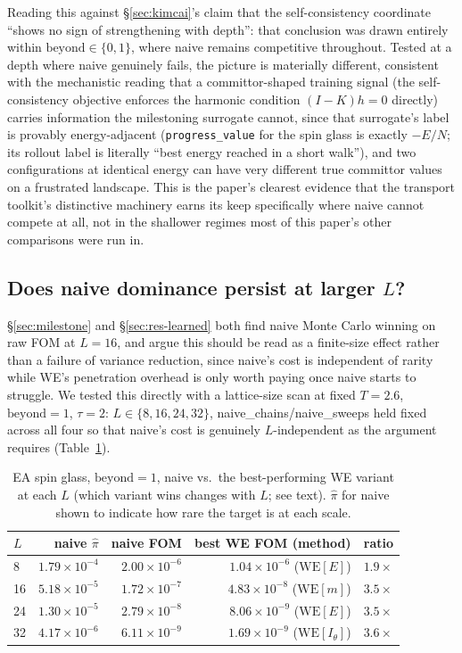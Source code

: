 \documentclass[a4paper,fleqn]{cas-sc}
\begin{document}
Reading this against \S\ref{sec:kimcai}'s claim that the self-consistency
	coordinate ``shows no sign of strengthening with depth'': that conclusion was drawn
entirely within $\mathrm{beyond}\in\{0,1\}$, where naive remains competitive throughout.
Tested at a depth where naive genuinely fails, the picture is materially different,
consistent with the mechanistic reading that a committor-shaped training signal (the
self-consistency objective enforces the harmonic condition $(I-K)h=0$ directly) carries
information the milestoning surrogate cannot, since that surrogate's label is provably
energy-adjacent (\texttt{progress\_value} for the spin glass is exactly $-E/N$; its
rollout label is literally ``best energy reached in a short walk''), and two
configurations at identical energy can have very different true committor values on a
frustrated landscape. This is the paper's clearest evidence that the transport toolkit's
distinctive machinery earns its keep specifically where naive cannot compete at all, not
in the shallower regimes most of this paper's other comparisons were run in.

\subsection{Does naive dominance persist at larger $L$?}\label{sec:lscaling}
\S\ref{sec:milestone} and \S\ref{sec:res-learned} both find naive Monte Carlo winning on
raw FOM at $L=16$, and argue this should be read as a finite-size effect rather than a
failure of variance reduction, since naive's cost is independent of rarity while WE's
penetration overhead is only worth paying once naive starts to struggle. We tested this
directly with a lattice-size scan at fixed $T=2.6$, $\mathrm{beyond}=1$, $\tau=2$: $L\in
\{8,16,24,32\}$, naive\_chains/naive\_sweeps held fixed across all four so that naive's
cost is genuinely $L$-independent as the argument requires (Table~\ref{tab:lscaling}).

\begin{table}[H]
\centering\small
\caption{EA spin glass, $\mathrm{beyond}=1$, naive vs.\ the best-performing WE variant at
	each $L$ (which variant wins changes with $L$; see text). $\hat\pi$ for naive shown to
	indicate how rare the target is at each scale.}
\label{tab:lscaling}
\begin{tabular}{lrrrr}
	\toprule
	$L$ & naive $\hat\pi$ & naive FOM & best WE FOM (method) & ratio \\
	\midrule
	8 & $1.79\times10^{-4}$ & $2.00\times10^{-6}$ & $1.04\times10^{-6}$ ($\mathrm{WE}[E]$) & $1.9\times$ \\
	16 & $5.18\times10^{-5}$ & $1.72\times10^{-7}$ & $4.83\times10^{-8}$ ($\mathrm{WE}[m]$) & $3.5\times$ \\
	24 & $1.30\times10^{-5}$ & $2.79\times10^{-8}$ & $8.06\times10^{-9}$ ($\mathrm{WE}[E]$) & $3.5\times$ \\
	32 & $4.17\times10^{-6}$ & $6.11\times10^{-9}$ & $1.69\times10^{-9}$ ($\mathrm{WE}[I_\theta]$) & $3.6\times$ \\
	\bottomrule
\end{tabular}
\end{table}
\end{document}
